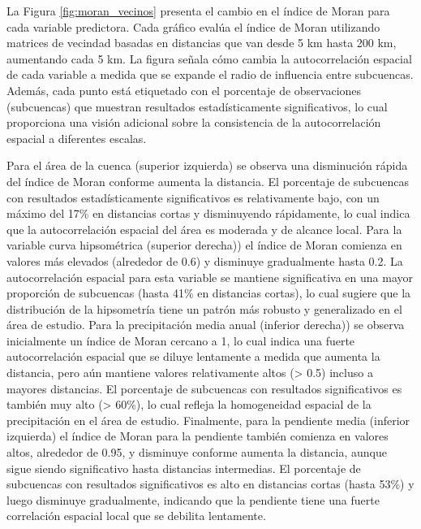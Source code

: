 \documentclass[
  manuscript=article,  
  layout=preprint,  
  year=2023,
  volume=0,
]{format}
\begin{document}
La Figura \ref{fig:moran_vecinos} presenta el cambio en el índice de Moran para cada variable predictora. Cada gráfico evalúa el índice de Moran utilizando matrices de vecindad basadas en distancias que van desde 5 km hasta 200 km, aumentando cada 5 km. La figura señala cómo cambia la autocorrelación espacial de cada variable a medida que se expande el radio de influencia entre subcuencas. Además, cada punto está etiquetado con el porcentaje de observaciones (subcuencas) que muestran resultados estadísticamente significativos, lo cual proporciona una visión adicional sobre la consistencia de la autocorrelación espacial a diferentes escalas.

Para el área de la cuenca (superior izquierda) se observa una disminución rápida del índice de Moran conforme aumenta la distancia. El porcentaje de subcuencas con resultados estadísticamente significativos es relativamente bajo, con un máximo del 17\% en distancias cortas y disminuyendo rápidamente, lo cual indica que la autocorrelación espacial del área es moderada y de alcance local. Para la variable curva hipsométrica (superior derecha)) el índice de Moran comienza en valores más elevados (alrededor de 0.6) y disminuye gradualmente hasta 0.2. La autocorrelación espacial para esta variable se mantiene significativa en una mayor proporción de subcuencas (hasta 41\% en distancias cortas), lo cual sugiere que la distribución de la hipsometría tiene un patrón más robusto y generalizado en el área de estudio. Para la precipitación media anual (inferior derecha)) se observa inicialmente un índice de Moran cercano a 1, lo cual indica una fuerte autocorrelación espacial que se diluye lentamente a medida que aumenta la distancia, pero aún mantiene valores relativamente altos (> 0.5) incluso a mayores distancias. El porcentaje de subcuencas con resultados significativos es también muy alto (> 60\%), lo cual refleja la homogeneidad espacial de la precipitación en el área de estudio. Finalmente, para la pendiente media (inferior izquierda) el índice de Moran para la pendiente también comienza en valores altos, alrededor de 0.95, y disminuye conforme aumenta la distancia, aunque sigue siendo significativo hasta distancias intermedias. El porcentaje de subcuencas con resultados significativos es alto en distancias cortas (hasta 53\%) y luego disminuye gradualmente, indicando que la pendiente tiene una fuerte correlación espacial local que se debilita lentamente.
\end{document}
